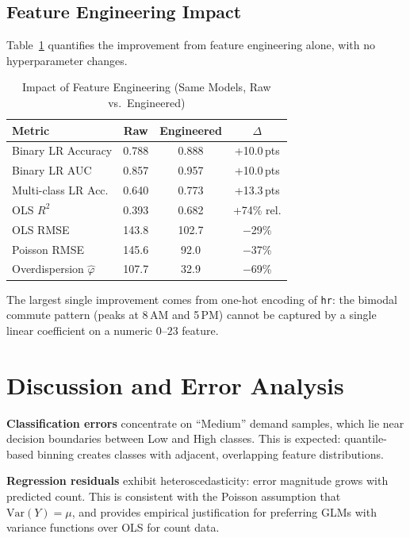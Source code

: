 \documentclass[conference]{IEEEtran}
\begin{document}
\subsection{Feature Engineering Impact}

Table~\ref{tab:fe_impact} quantifies the improvement from feature engineering alone, with no hyperparameter changes.

\begin{table}[H]
\centering
\caption{Impact of Feature Engineering (Same Models, Raw vs.\ Engineered)}
\label{tab:fe_impact}
\begin{tabular}{@{}lccc@{}}
\toprule
\textbf{Metric} & \textbf{Raw} & \textbf{Engineered} & \textbf{$\Delta$} \\ \midrule
Binary LR Accuracy & 0.788 & 0.888 & +10.0\,pts \\
Binary LR AUC      & 0.857 & 0.957 & +10.0\,pts \\
Multi-class LR Acc. & 0.640 & 0.773 & +13.3\,pts \\
OLS $R^2$          & 0.393 & 0.682 & +74\% rel. \\
OLS RMSE           & 143.8 & 102.7 & $-$29\% \\
Poisson RMSE       & 145.6 & 92.0  & $-$37\% \\
Overdispersion $\hat{\varphi}$ & 107.7 & 32.9 & $-$69\% \\
\bottomrule
\end{tabular}
\end{table}

The largest single improvement comes from one-hot encoding of \texttt{hr}: the bimodal commute pattern (peaks at 8\,AM and 5\,PM) cannot be captured by a single linear coefficient on a numeric $0$--$23$ feature.

\section{Discussion and Error Analysis}

\textbf{Classification errors} concentrate on ``Medium'' demand samples, which lie near decision boundaries between Low and High classes.
This is expected: quantile-based binning creates classes with adjacent, overlapping feature distributions.

\textbf{Regression residuals} exhibit heteroscedasticity: error magnitude grows with predicted count.
This is consistent with the Poisson assumption that $\mathrm{Var}(Y) = \mu$, and provides empirical justification for preferring GLMs with variance functions over OLS for count data.
\end{document}
